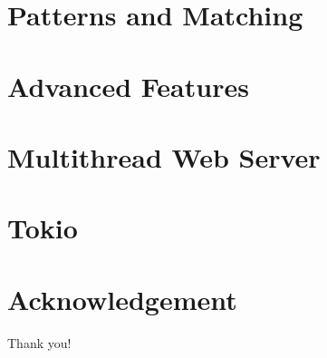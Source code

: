 \documentclass{beamer}
\begin{document}
\section{Patterns and Matching}
\section{Advanced Features}
\section{Multithread Web Server}
\section{Tokio}

\section*{Acknowledgement}
\begin{frame}
	\Huge{\centerline{Thank you!}}
\end{frame}
\end{document}
